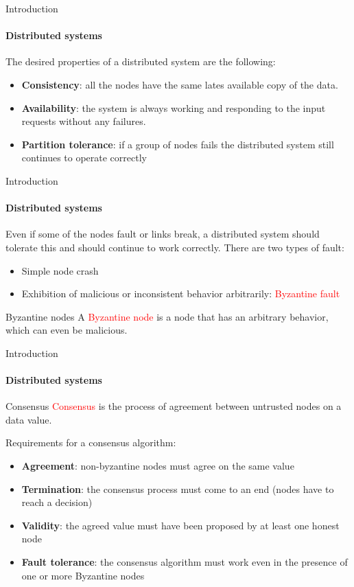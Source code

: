 \documentclass{beamer}
\newcommand\red[1]{\textcolor{red}{#1}}
\begin{document}
  \begin{frame}{Introduction}
    \framesubtitle{Distributed systems}
      The desired properties of a distributed system are the following:\vspace{10pt}
      \begin{itemize}
        \item \textbf{Consistency}: all the nodes have the same lates available copy of the data.
        \item \textbf{Availability}: the system is always working and responding to the
        input requests without any failures.
        \item \textbf{Partition tolerance}: if a group of nodes fails the distributed system
        still continues to operate correctly
      \end{itemize}
  \end{frame}




  \begin{frame}{Introduction}
    \framesubtitle{Distributed systems}
    Even if some of the nodes fault or links break, a distributed system should tolerate
    this and should continue to work correctly. There are two types of fault:
    \begin{itemize}
      \item Simple node crash
      \item Exhibition of malicious or inconsistent behavior arbitrarily: \red{Byzantine fault}
    \end{itemize}

    \pause 
    \begin{block}{Byzantine nodes}
      A \textcolor{red}{Byzantine node} is a node that has an arbitrary behavior,
      which can even be malicious.
    \end{block}
  \end{frame}




  \begin{frame}{Introduction}
    \framesubtitle{Distributed systems}
    \begin{block}{Consensus}
      \red{Consensus} is the process of agreement between untrusted nodes on a data
      value.
    \end{block}

    \pause
    Requirements for a consensus algorithm:
    \begin{itemize}
      \item \textbf{Agreement}: non-byzantine nodes must agree on the same value
      \item \textbf{Termination}: the consensus process must come to an end (nodes
      have to reach a decision)
      \item \textbf{Validity}: the agreed value must have been proposed by at
      least one honest node
      \item \textbf{Fault tolerance}: the consensus algorithm must work even
      in the presence of one or more Byzantine nodes
    \end{itemize}
  \end{frame}
\end{document}
